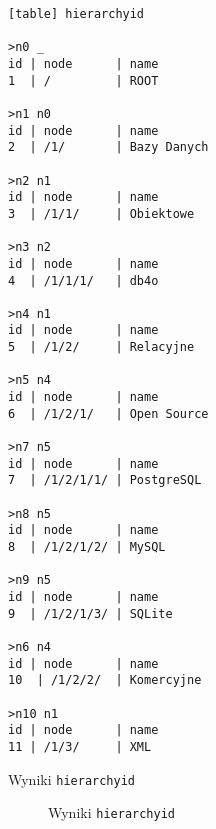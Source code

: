 \begin{verbatim}[table] hierarchyid

>n0 _
id | node      | name
1  | /         | ROOT

>n1 n0
id | node      | name
2  | /1/       | Bazy Danych

>n2 n1
id | node      | name
3  | /1/1/     | Obiektowe

>n3 n2
id | node      | name
4  | /1/1/1/   | db4o

>n4 n1
id | node      | name
5  | /1/2/     | Relacyjne

>n5 n4
id | node      | name
6  | /1/2/1/   | Open Source

>n7 n5
id | node      | name
7  | /1/2/1/1/ | PostgreSQL

>n8 n5
id | node      | name
8  | /1/2/1/2/ | MySQL

>n9 n5
id | node      | name
9  | /1/2/1/3/ | SQLite

>n6 n4
id | node      | name
10  | /1/2/2/  | Komercyjne

>n10 n1
id | node      | name
11 | /1/3/     | XML

\end{verbatim}












\begin{table}[h!]
  \caption{Wyniki \texttt{hierarchyid}}
  \begin{center}
  \end{center}
\end{table}

\begin{figure}[h!t]
  \caption{Wyniki \texttt{hierarchyid}}
  \label{fig:img_chart_simple}
  \begin{center}
  \end{center}
\end{figure}


